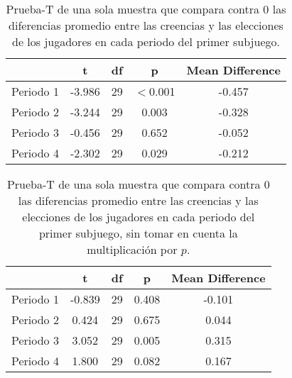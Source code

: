 \begin{table}
\caption[Diferencias Relativas en el Subjuego 1]{Prueba-T de una sola muestra que compara contra 0 las diferencias promedio entre las creencias y las elecciones de los jugadores en cada periodo del primer subjuego.}
\label{DN_Sub1}
\centering
\begin{tabular}{l | c c c c}  %
\toprule
\textbf{} & \textbf{t} & \textbf{df} & \textbf{p} & \textbf{Mean Difference}\\
\midrule
Periodo 1 & -3.986 & 29 & $<$0.001 & -0.457 \\
Periodo 2 & -3.244 & 29 & 0.003 & -0.328 \\
Periodo 3 & -0.456 & 29 & 0.652 & -0.052 \\
Periodo 4 & -2.302 & 29 & 0.029 & -0.212 \\
\bottomrule
\end{tabular}
\end{table}


\begin{table}
\caption[Diferencias Relativas en el Subjuego 1, omitiendo la multiplicación $\cdot p$]{Prueba-T de una sola muestra que compara contra 0 las diferencias promedio entre las creencias y las elecciones de los jugadores en cada periodo del primer subjuego, sin tomar en cuenta la multiplicación por $p$.}
\label{DN_Sub1}
\centering
\begin{tabular}{l | c c c c}  %
\toprule
\textbf{} & \textbf{t} & \textbf{df} & \textbf{p} & \textbf{Mean Difference}\\
\midrule
Periodo 1 & -0.839 & 29 & 0.408 & -0.101 \\
Periodo 2 & 0.424 & 29 & 0.675 & 0.044 \\
Periodo 3 & 3.052 & 29 & 0.005 & 0.315 \\
Periodo 4 & 1.800 & 29 & 0.082 & 0.167 \\
\bottomrule
\end{tabular}
\end{table}

